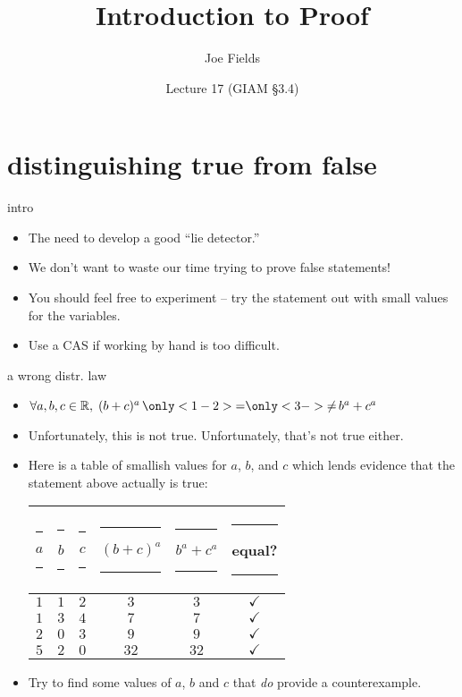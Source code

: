 \documentclass[landscape]{beamer}
\author{Joe Fields}
\title{Introduction to Proof}
\date{Lecture 17 (GIAM \S 3.4)}
\institute[SCSU]{ {\tt fieldsj1@southernct.edu} }
\begin{document}
\begin{frame}[plain]
  \titlepage
\end{frame}

\section{distinguishing true from false}

\begin{frame}{intro}
\begin{itemize}
\item The need to develop a good ``lie detector.'' \pause
\item We don't want to waste our time trying to prove false statements! \pause
\item You should feel free to experiment -- try the statement out with small values for the variables. \pause
\item Use a CAS if working by hand is too difficult.
\end{itemize}
\end{frame}

\begin{frame}{a wrong distr. law}
\begin{itemize}
\item $\forall a,b,c \in \Reals, \; (b+c)^a \, \only<1-2>{=} \only<3->{\neq} \, b^a + c^a$ \pause
\item Unfortunately, this is not true. \pause \pause Unfortunately, that's not true either. \pause
\item Here is a table of smallish values for $a$, $b$, and $c$ which lends evidence that the statement above actually is true: \pause

\begin{tabular}{ccc|c|c|c}
\rule{6pt}{0pt} $a$ \rule{6pt}{0pt} & \rule{6pt}{0pt} $b$ \rule{6pt}{0pt} & \rule{6pt}{0pt} $c$ \rule{6pt}{0pt} & \rule{6pt}{0pt} $(b+c)^a$ \rule{6pt}{0pt} & \rule{6pt}{0pt} $b^a + c^a$ \rule{6pt}{0pt} & \rule{6pt}{0pt} equal? \rule{6pt}{0pt} \\ \hline
\rule[-4pt]{0pt}{20pt} $1$ & $1$ & $2$ & $3$ & $3$ & $\checkmark$ \\
\rule[-4pt]{0pt}{20pt} $1$ & $3$ & $4$ & $7$ & $7$ & $\checkmark$ \\
\rule[-4pt]{0pt}{20pt} $2$ & $0$ & $3$ & $9$ & $9$ & $\checkmark$ \\
\rule[-4pt]{0pt}{20pt} $5$ & $2$ & $0$ & $32$ & $32$ & $\checkmark$ \\
\end{tabular}
\pause

\item Try to find some values of $a$, $b$ and $c$ that {\em do} provide a counterexample.

\end{itemize}
\end{frame}
\end{document}
